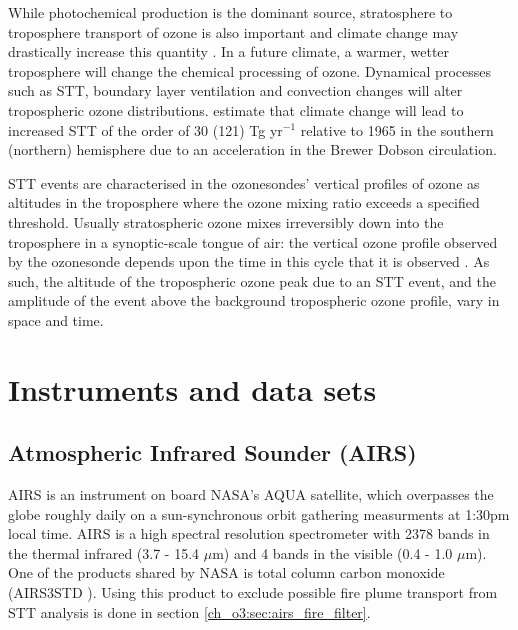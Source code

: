     While photochemical production is the dominant source, stratosphere to troposphere transport of ozone is also important and climate change may drastically increase this quantity \citep{Hegglin_2009}.
    In a future climate, a warmer, wetter troposphere will change the chemical processing of ozone.
    Dynamical processes such as STT, boundary layer ventilation and convection changes will alter tropospheric ozone distributions.
    \citet{Hegglin_2009} estimate that climate change will lead to increased STT of the order of 30 (121) Tg yr$^{-1}$ relative to 1965 in the southern (northern) hemisphere due to an acceleration in the Brewer Dobson circulation. 
    
    STT events are characterised in the ozonesondes' vertical profiles of ozone as altitudes in the troposphere where the ozone mixing ratio exceeds a specified threshold. 
    Usually stratospheric ozone mixes irreversibly down into the troposphere in a synoptic-scale tongue of air: the vertical ozone profile observed by the ozonesonde depends upon the time in this cycle that it is observed \citep{Sprenger2003}. 
    As such, the altitude of the tropospheric ozone peak due to an STT event, and the amplitude of the event above the background tropospheric ozone profile, vary in space and time.


\section{Instruments and data sets}
  \subsection{Atmospheric Infrared Sounder (AIRS)}
    AIRS is an instrument on board NASA's AQUA satellite, which overpasses the globe roughly daily on a sun-synchronous orbit gathering measurments at 1:30pm local time.
    AIRS is a high spectral resolution spectrometer with 2378 bands in the thermal infrared (3.7 - 15.4 $\mu$m) and 4 bands in the visible (0.4 - 1.0 $\mu$m).
    One of the products shared by NASA is total column carbon monoxide (AIRS3STD \citep{AIRS3STD}).
    Using this product to exclude possible fire plume transport from STT analysis is done in section \ref{ch_o3:sec:airs_fire_filter}.
  
